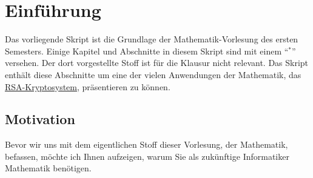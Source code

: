 \chapter{Einführung}
Das vorliegende Skript ist die Grundlage der Mathematik-Vorlesung des ersten Semesters.
Einige Kapitel und Abschnitte in diesem Skript sind mit einem ``$^*$'' versehen.  
Der dort vorgestellte Stoff ist für die Klausur nicht relevant.  Das Skript enthält diese Abschnitte
um eine der vielen Anwendungen der Mathematik, das
\href{https://de.wikipedia.org/wiki/RSA-Kryptosystem}{RSA-Kryptosystem}, präsentieren zu können.  

\section{Motivation}
Bevor wir uns mit dem eigentlichen Stoff dieser Vorlesung, der Mathematik, befassen, möchte ich
Ihnen aufzeigen, warum Sie als zukünftige Informatiker Mathematik benötigen.  
